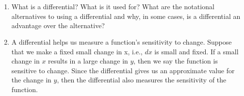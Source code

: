 \section{}
\begin{enumerate}%



\item  What is a differential?  What is it used for?  What are the notational alternatives to using a differential and why, in some cases, is a differential an advantage over the alternative?


\item  A differential helps us measure a function's sensitivity to change.  Suppose that we make a fixed small change in x, i.e., $dx$ is small and fixed.  If a small change in $x$ results in a large change in $y$, then we say the function is sensitive to change.  Since the differential gives us an approximate value for the change in $y$, then the differential also measures the sensitivity of the function.

\end{enumerate}



 